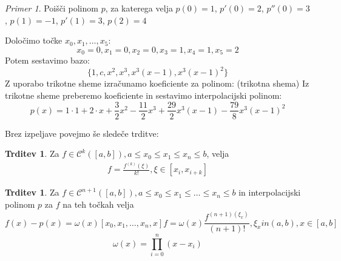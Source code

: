 \documentclass[a4paper,12pt]{article}
\theoremstyle{definition}
\newtheorem{claim}[counter]{Trditev}
\theoremstyle{remark}
\newtheorem*{ex}{Primer}
\begin{document}
\begin{ex}
    Poišči polinom $p$, za katerega velja $p(0) = 1$, $p'(0) = 2$, $p''(0) = 3$, $p(1) = -1$, $p'(1) = 3$, $p(2) = 4$

    Določimo točke $x_0, x_1, \dots, x_5$:
    \begin{equation*}
        x_0 = 0, x_1 = 0, x_2 = 0, x_3 = 1, x_4 = 1, x_5 = 2
    \end{equation*}
    Potem sestavimo bazo:
    \begin{equation*}
        \{1, c, x^2, x^3, x^3(x-1), x^3(x-1)^2\}
    \end{equation*}
    Z uporabo trikotne sheme izračunamo koeficiente za polinom:
    (trikotna shema)
    Iz trikotne sheme preberemo koeficiente in sestavimo interpolacijski polinom:
    \begin{equation*}
        p(x) = 1 \cdot 1 + 2 \cdot x + \frac{3}{2} x^2 - \frac{11}{2}x^3 + \frac{29}{2}x^3(x-1) - \frac{79}{8} x^3(x-1)^2
    \end{equation*}
\end{ex}

Brez izpeljave povejmo še sledeče trditve:
\begin{claim}
    Za $f \in \mathscr{C}^k ([a, b]), a \leq x_0 \leq x_1 \leq x_n \leq b$, velja
    \begin{align*}
        [x_i, x_{i+1}, \dots, x_{i+k}] f = \frac{f^{(k)}(\xi)}{k!}, \xi \in [x_i, x_{i+k}]
    \end{align*}
\end{claim}


\begin{claim}
    Za $f \in \mathscr{C}^{n+1}([a, b]), a \leq x_0 \leq x_1 \leq \dots \leq x_n \leq b$ in interpolacijski polinom $p$ za $f$ na teh točkah velja
    \begin{equation*}
        f(x) - p(x) = \omega(x) [x_0, x_1, \dots, x_n, x] f = \omega(x) \frac{f^{(n+1)(\xi_x)}}{(n+1)!}, \xi_x in (a, b), x \in [a, b]
    \end{equation*}
    \begin{equation*}
        \omega(x) = \prod_{i = 0}^{n} (x-x_i)
    \end{equation*}
\end{claim}
\end{document}
